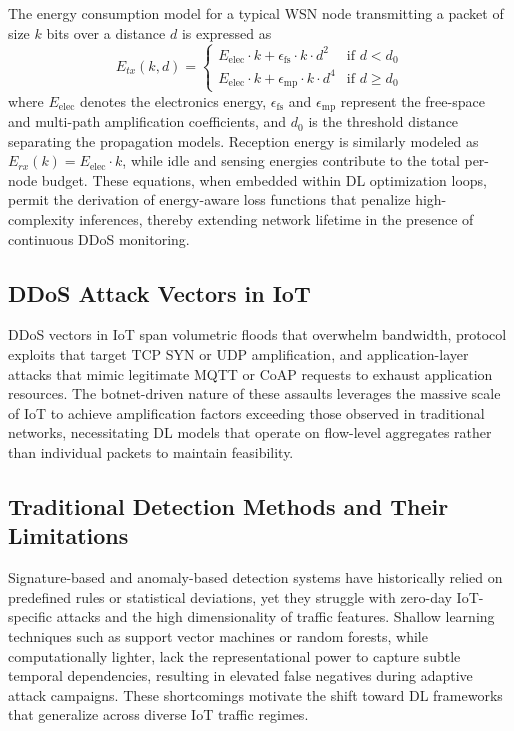 \documentclass[12pt]{article}
\begin{document}
The energy consumption model for a typical WSN node transmitting a packet of size \(k\) bits over a distance \(d\) is expressed as
\[
E_{tx}(k, d) = 
\begin{cases} 
E_{\text{elec}} \cdot k + \epsilon_{\text{fs}} \cdot k \cdot d^2 & \text{if } d < d_0 \\
E_{\text{elec}} \cdot k + \epsilon_{\text{mp}} \cdot k \cdot d^4 & \text{if } d \geq d_0 
\end{cases}
\]
where \(E_{\text{elec}}\) denotes the electronics energy, \(\epsilon_{\text{fs}}\) and \(\epsilon_{\text{mp}}\) represent the free-space and multi-path amplification coefficients, and \(d_0\) is the threshold distance separating the propagation models. Reception energy is similarly modeled as \(E_{rx}(k) = E_{\text{elec}} \cdot k\), while idle and sensing energies contribute to the total per-node budget. These equations, when embedded within DL optimization loops, permit the derivation of energy-aware loss functions that penalize high-complexity inferences, thereby extending network lifetime in the presence of continuous DDoS monitoring.

\subsection{DDoS Attack Vectors in IoT}

DDoS vectors in IoT span volumetric floods that overwhelm bandwidth, protocol exploits that target TCP SYN or UDP amplification, and application-layer attacks that mimic legitimate MQTT or CoAP requests to exhaust application resources. The botnet-driven nature of these assaults leverages the massive scale of IoT to achieve amplification factors exceeding those observed in traditional networks, necessitating DL models that operate on flow-level aggregates rather than individual packets to maintain feasibility.

\subsection{Traditional Detection Methods and Their Limitations}

Signature-based and anomaly-based detection systems have historically relied on predefined rules or statistical deviations, yet they struggle with zero-day IoT-specific attacks and the high dimensionality of traffic features. Shallow learning techniques such as support vector machines or random forests, while computationally lighter, lack the representational power to capture subtle temporal dependencies, resulting in elevated false negatives during adaptive attack campaigns. These shortcomings motivate the shift toward DL frameworks that generalize across diverse IoT traffic regimes.
\end{document}
